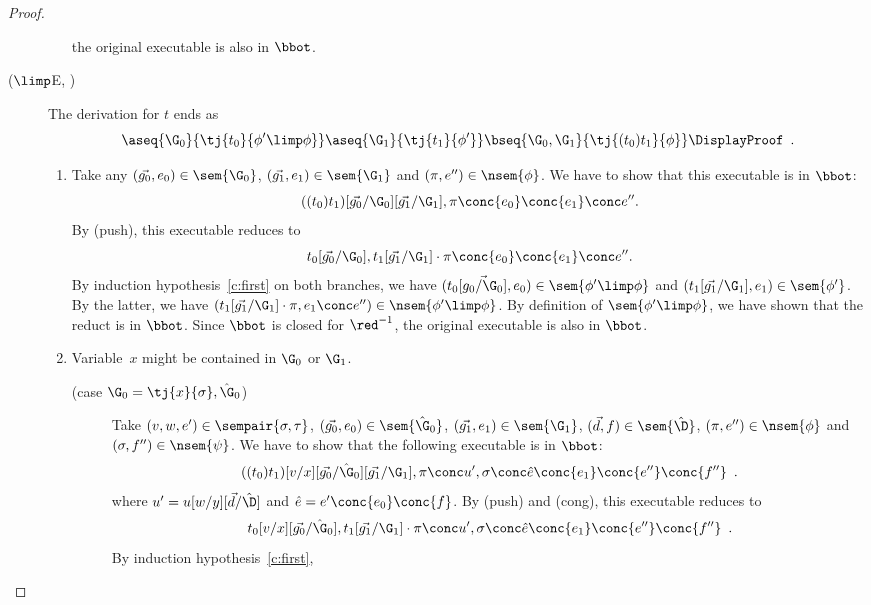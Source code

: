 \begin{proof}
\begin{description}
\begin{enumerate}[label=\textit{(\arabic{*})}]
	       the original executable is also in $\bbot$.
	\end{enumerate}
   \item[($\limp$E, \textminus)]
	The derivation for $t$ ends as
	\[
	\aseq{\G_0}{\tj{t_0}{\phi'\limp\phi}}
	\aseq{\G_1}{\tj{t_1}{\phi'}}
	\bseq{\G_0,\G_1}{\tj{(t_0)t_1}{\phi}}
	\DisplayProof\enspace.
	\]
	\begin{enumerate}[label=\textit{(\arabic{*})}]
	 \item Take any
	       $(\vec{g_0},{e_0})\in\sem{\G_0}$,
	       $(\vec{g_1},{e_1})\in\sem{\G_1}$ and
	       $(\pi,e'')\in\nsem{\phi}$.
	       We have to show that this executable is in $\bbot$:
	       \[
		((t_0)t_1)[\vec{g_0}/\G_0][\vec{g_1}/\G_1],\pi\conc
	       {e_0}\conc {e_1}\conc e''.
	       \]
	       By (push), this executable reduces to
	       \[
		t_0[\vec{g_0}/\G_0], t_1[\vec{g_1}/\G_1]\cdot \pi
	       \conc {e_0}\conc {e_1}\conc e''.
	       \]
	       By induction hypothesis~\ref{c:first} on both branches,
	       we have $(t_0[\vec{g_0/\G_0}],
	       {e_0})\in\sem{\phi'\limp\phi}$
	       and
	       $(t_1[\vec{g_1}/\G_1],{e_1})\in\sem{\phi'}$.
	       By the latter, we have $(t_1[\vec{g_1}/\G_1]\cdot\pi,
	       {e_1}\conc e'')\in\nsem{\phi'\limp\phi}$.
	       By definition of $\sem{\phi'\limp\phi}$, we have shown that the
	       reduct is in $\bbot$.
	       Since $\bbot$ is closed for $\red^{-1}$,
	       the original executable is also in $\bbot$.
	 \item Variable~$x$ might be contained in $\G_0$ or $\G_1$.
	       \begin{description}
		\item[(case $\G_0 = \tj{x}{\sigma},\hat\G_0$)]
		     Take
		     $(v,w,e')\in\sempair{\sigma,\tau}$,
		     $(\vec{g_0},{e_0})\in\sem{\hat\G_0}$,
		     $(\vec{g_1},{e_1})\in\sem{\G_1}$,
		     $(\vec{d},{f})\in\sem{\hat\D}$,
		     $(\pi,e'')\in\nsem{\phi}$ and
		     $(\sigma,f'')\in\nsem{\psi}$.
		     We have to show that the following executable is in
		     $\bbot$:
		     \[
		     ((t_0)t_1)[v/x][\vec{g_0}/\hat\G_0][\vec{g_1}/\G_1],\pi\conc
		     u' ,\sigma\conc \hat e\conc {{e_1}}\conc
		     {e''}\conc{f''}\enspace.
		     \]
		     where
		     $u' = u[w/y][\vec{d}/\hat\D]$ and
		     $\hat e= e'\conc {e_0}\conc {f}$.
		     By (push) and (cong), this executable reduces to
		     \[
		     t_0[v/x][\vec{g_0}/\hat\G_0],
		     t_1[\vec{g_1}/\G_1]\cdot\pi
		     \conc
		     u' ,\sigma\conc \hat e\conc {{e_1}}\conc
		     {e''}\conc{f''}\enspace.
		     \]
		     By induction hypothesis~\ref{c:first},

\end{description}
\end{enumerate}
\end{description}
\end{proof}
